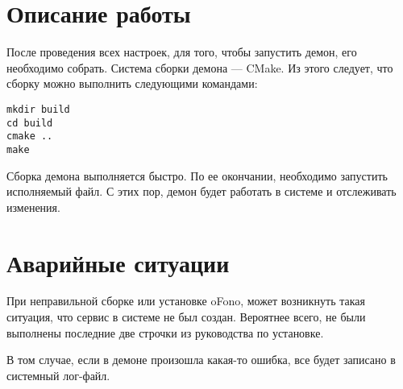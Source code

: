 \documentclass[14pt,a4paper]{report}
\begin{document}
\section{Описание работы}
После проведения всех настроек, для того, чтобы запустить демон, его необходимо собрать. Система сборки демона --- CMake. Из этого следует, что сборку можно выполнить следующими командами:
\begin{verbatim}
mkdir build
cd build
cmake ..
make
\end{verbatim}
Сборка демона выполняется быстро. По ее окончании, необходимо запустить исполняемый файл. С этих пор, демон будет работать в системе и отслеживать изменения.

\section{Аварийные ситуации}
При неправильной сборке или установке oFono, может возникнуть такая ситуация, что сервис в системе не был создан. Вероятнее всего, не были выполнены последние две строчки из руководства по установке.

В том случае, если в демоне произошла какая-то ошибка, все будет записано в системный лог-файл.
\end{document}
